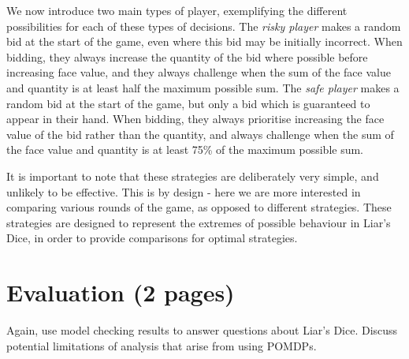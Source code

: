 We now introduce two main types of player, exemplifying the different possibilities for each of these types of decisions. The \emph{risky player} makes a random bid at the start of the game, even where this bid may be initially incorrect. When bidding, they always increase the quantity of the bid where possible before increasing face value, and they always challenge when the sum of the face value and quantity is at least half the maximum possible sum. The \emph{safe player} makes a random bid at the start of the game, but only a bid which is guaranteed to appear in their hand. When bidding, they always prioritise increasing the face value of the bid rather than the quantity, and always challenge when the sum of the face value and quantity is at least 75\% of the maximum possible sum.

It is important to note that these strategies are deliberately very simple, and unlikely to be effective. This is by design - here we are more interested in comparing various rounds of the game, as opposed to different strategies. These strategies are designed to represent the extremes of possible behaviour in Liar's Dice, in order to provide comparisons for optimal strategies.



\section{Evaluation (2 pages)}

Again, use model checking results to answer questions about Liar's Dice. Discuss potential limitations of analysis that arise from using POMDPs.

